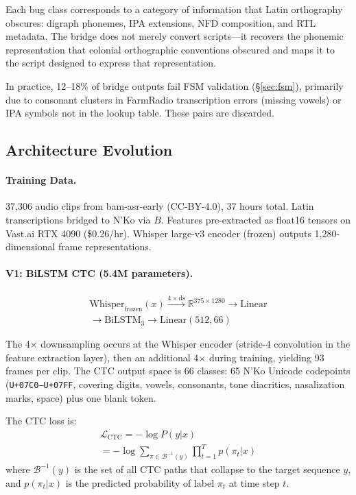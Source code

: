 \documentclass[11pt]{article}
\begin{document}
Each bug class corresponds to a category of information that Latin orthography obscures: digraph phonemes, IPA extensions, NFD composition, and RTL metadata.
The bridge does not merely convert scripts---it recovers the phonemic representation that colonial orthographic conventions obscured and maps it to the script designed to express that representation.

In practice, 12--18\% of bridge outputs fail FSM validation (\S\ref{sec:fsm}), primarily due to consonant clusters in FarmRadio transcription errors (missing vowels) or IPA symbols not in the lookup table.
These pairs are discarded.

\subsection{Architecture Evolution}

\paragraph{Training Data.}
37,306 audio clips from bam-asr-early (CC-BY-4.0), 37 hours total.
Latin transcriptions bridged to N'Ko via $B$.
Features pre-extracted as float16 tensors on Vast.ai RTX 4090 (\$0.26/hr).
Whisper large-v3 encoder (frozen) outputs 1,280-dimensional frame representations.

\paragraph{V1: BiLSTM CTC (5.4M parameters).}
\begin{multline}
\text{Whisper}_{\text{frozen}}(x) \xrightarrow{4\times\text{ds}} \mathbb{R}^{375 \times 1280} \to \text{Linear} \\
\to \text{BiLSTM}_3 \to \text{Linear}(512, 66)
\end{multline}

The 4$\times$ downsampling occurs at the Whisper encoder (stride-4 convolution in the feature extraction layer), then an additional 4$\times$ during training, yielding 93 frames per clip.
The CTC output space is 66 classes: 65 N'Ko Unicode codepoints (\texttt{U+07C0--U+07FF}, covering digits, vowels, consonants, tone diacritics, nasalization marks, space) plus one blank token.

The CTC loss is:
\begin{multline}
\mathcal{L}_\text{CTC} = -\log P(y | x) \\
= -\log \sum_{\pi \in \mathcal{B}^{-1}(y)} \prod_{t=1}^{T} p(\pi_t | x)
\end{multline}
where $\mathcal{B}^{-1}(y)$ is the set of all CTC paths that collapse to the target sequence $y$, and $p(\pi_t | x)$ is the predicted probability of label $\pi_t$ at time step $t$.
\end{document}
